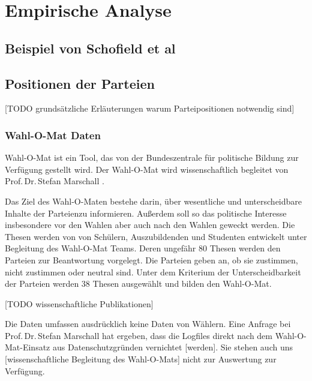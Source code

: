 
\chapter{Empirische Analyse}\label{Kap-Empirische-Analyse}

\section{Beispiel von Schofield et al}

\section{Positionen der Parteien}\label{Sec-Parteienpositionen}

[TODO grundsätzliche Erläuterungen warum Parteipositionen notwendig sind]

\subsection{Wahl-O-Mat Daten}
Wahl-O-Mat \citep{WahlOMat} ist ein Tool, das von der Bundeszentrale für politische Bildung zur Verfügung gestellt wird. Der Wahl-O-Mat wird wissenschaftlich begleitet von Prof.\,Dr.\,Stefan Marschall \citep{MarschallWahlOMat}.

Das Ziel des Wahl-O-Maten bestehe darin, über \glqq wesentliche und unterscheidbare Inhalte der Parteien\grqq zu informieren. Außerdem soll so das politische Interesse insbesondere vor den Wahlen aber auch nach den Wahlen geweckt werden. 
Die Thesen werden von von Schülern, Auszubildenden und Studenten entwickelt unter Begleitung des Wahl-O-Mat Teams. Deren ungefähr 80 Thesen werden den Parteien zur Beantwortung vorgelegt. Die Parteien geben an, ob sie zustimmen, nicht zustimmen oder neutral sind. Unter dem Kriterium der Unterscheidbarkeit der Parteien werden  38 Thesen ausgewählt und bilden den Wahl-O-Mat. %

[TODO wissenschaftliche Publikationen]

Die Daten umfassen ausdrücklich keine Daten von Wählern. Eine Anfrage bei Prof.\,Dr.\,Stefan Marschall hat ergeben, dass \glqq die Logfiles direkt nach dem Wahl-O-Mat-Einsatz aus Datenschutzgründen vernichtet [werden]. Sie stehen auch uns [wissenschaftliche Begleitung des Wahl-O-Mats] nicht zur Auswertung zur Verfügung.\grqq

